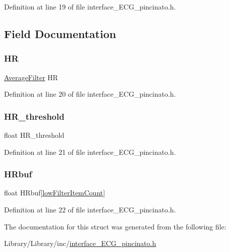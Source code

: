 Definition at line 19 of file interface\+\_\+\+E\+C\+G\+\_\+pincinato.\+h.



\subsection{Field Documentation}
\mbox{\label{struct_process_data_______afa7d4c3f6f59fcc62e758b829d298569}} 
\subsubsection{\texorpdfstring{HR}{HR}}
{\footnotesize\ttfamily \mbox{\hyperlink{filter__math__pincinato_8h_a05751bcbb0782121ff05ae3b7fc37dac}{Average\+Filter}} HR}



Definition at line 20 of file interface\+\_\+\+E\+C\+G\+\_\+pincinato.\+h.

\mbox{\label{struct_process_data_______aa85aa87ff25601cf758c39958653d60a}} 
\subsubsection{\texorpdfstring{H\+R\+\_\+threshold}{HR\_threshold}}
{\footnotesize\ttfamily float H\+R\+\_\+threshold}



Definition at line 21 of file interface\+\_\+\+E\+C\+G\+\_\+pincinato.\+h.

\mbox{\label{struct_process_data_______abe41d3213d4f1e10d1ce88c78db23a22}} 
\subsubsection{\texorpdfstring{H\+Rbuf}{HRbuf}}
{\footnotesize\ttfamily float H\+Rbuf\mbox{[}\mbox{\hyperlink{interface___e_c_g__pincinato_8h_aa57c4fd3ea06cc9a9c4e8ecda369ed58}{low\+Filter\+Item\+Count}}\mbox{]}}



Definition at line 22 of file interface\+\_\+\+E\+C\+G\+\_\+pincinato.\+h.



The documentation for this struct was generated from the following file\+:\begin{DoxyCompactItemize}
\item 
Library/\+Library/inc/\mbox{\hyperlink{interface___e_c_g__pincinato_8h}{interface\+\_\+\+E\+C\+G\+\_\+pincinato.\+h}}\end{DoxyCompactItemize}
